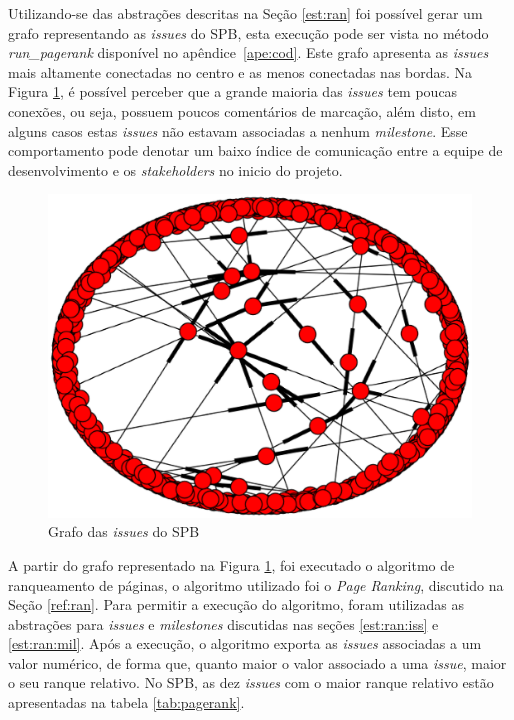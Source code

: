 Utilizando-se das abstrações descritas na Seção \ref{est:ran} foi possível gerar um grafo representando as \textit{issues} do SPB, esta execução pode ser vista no método \textit{run\_pagerank} disponível no apêndice~\ref{ape:cod}. Este grafo apresenta as \textit{issues} mais altamente conectadas no centro e as menos conectadas nas bordas. Na Figura \ref{fig:graph}, é possível perceber que a grande maioria das \textit{issues} tem poucas conexões, ou seja, possuem poucos comentários de marcação, além disto, em alguns casos estas \textit{issues} não estavam associadas a nenhum \textit{milestone}. Esse comportamento pode denotar um baixo índice de comunicação entre a equipe de desenvolvimento e os \textit{stakeholders} no inicio do projeto.

\begin{figure}[!h]
    \centering
        \includegraphics[keepaspectratio=true,scale=0.5]{figuras/graph.eps}
    \caption{Grafo das \textit{issues} do SPB}
    \label{fig:graph}
\end{figure}

A partir do grafo representado na Figura \ref{fig:graph}, foi executado o algoritmo de ranqueamento de páginas, o algoritmo utilizado foi o \textit{Page Ranking}, discutido na Seção \ref{ref:ran}. Para permitir a execução do algoritmo, foram utilizadas as abstrações para \textit{issues} e \textit{milestones} discutidas nas seções \ref{est:ran:iss} e \ref{est:ran:mil}. Após a execução, o algoritmo exporta as \textit{issues} associadas a um valor numérico, de forma que, quanto maior o valor associado a uma \textit{issue}, maior o seu ranque relativo. No SPB, as dez \textit{issues} com o maior ranque relativo estão apresentadas na tabela \ref{tab:pagerank}. 

